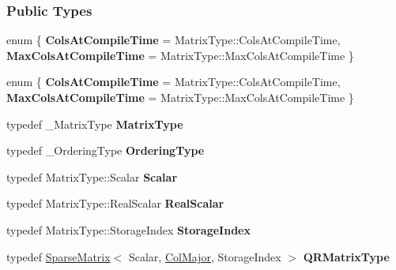 \subsubsection*{Public Types}
\begin{DoxyCompactItemize}
\item 
\mbox{\label{group___sparse_q_r___module_ae5104626a1cafa6983faea1eac502423}} 
enum \{ {\bfseries Cols\+At\+Compile\+Time} = Matrix\+Type\+:\+:Cols\+At\+Compile\+Time, 
{\bfseries Max\+Cols\+At\+Compile\+Time} = Matrix\+Type\+:\+:Max\+Cols\+At\+Compile\+Time
 \}
\item 
\mbox{\label{group___sparse_q_r___module_a35abf47af4398e4b73b4d924a7c2f2a4}} 
enum \{ {\bfseries Cols\+At\+Compile\+Time} = Matrix\+Type\+:\+:Cols\+At\+Compile\+Time, 
{\bfseries Max\+Cols\+At\+Compile\+Time} = Matrix\+Type\+:\+:Max\+Cols\+At\+Compile\+Time
 \}
\item 
\mbox{\label{group___sparse_q_r___module_ad358268460ec00e9cd058846a2cbb6f5}} 
typedef \+\_\+\+Matrix\+Type {\bfseries Matrix\+Type}
\item 
\mbox{\label{group___sparse_q_r___module_a6b2f072bb9206c83f6046f25fcc4dbbe}} 
typedef \+\_\+\+Ordering\+Type {\bfseries Ordering\+Type}
\item 
\mbox{\label{group___sparse_q_r___module_a1b368cb269850c36954d938a9e216ee9}} 
typedef Matrix\+Type\+::\+Scalar {\bfseries Scalar}
\item 
\mbox{\label{group___sparse_q_r___module_a30621d97daf0e3ef2337b7c37cb8f3d9}} 
typedef Matrix\+Type\+::\+Real\+Scalar {\bfseries Real\+Scalar}
\item 
\mbox{\label{group___sparse_q_r___module_a2e4bf46ef8f961837762d60860748938}} 
typedef Matrix\+Type\+::\+Storage\+Index {\bfseries Storage\+Index}
\item 
\mbox{\label{group___sparse_q_r___module_ac76f0c57477167d62af888c0d41d6efc}} 
typedef \hyperlink{group___sparse_core___module_class_eigen_1_1_sparse_matrix}{Sparse\+Matrix}$<$ Scalar, \hyperlink{group__enums_ggaacded1a18ae58b0f554751f6cdf9eb13a0cbd4bdd0abcfc0224c5fcb5e4f6669a}{Col\+Major}, Storage\+Index $>$ {\bfseries Q\+R\+Matrix\+Type}

\end{DoxyCompactItemize}
